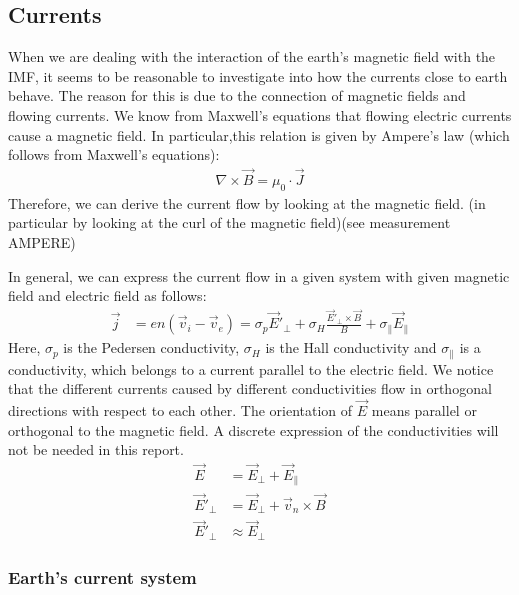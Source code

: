 \documentclass[10pt,a4paper]{article}
\begin{document}
\subsection{Currents}

When we are dealing with the interaction of the earth's magnetic field with the IMF, it seems to be reasonable to investigate into how the currents close to earth behave. 
The reason for this is due to the connection of magnetic fields and flowing currents. We know from Maxwell's equations that flowing electric currents cause a magnetic field. In particular,this relation is given by Ampere's law (which follows from Maxwell's equations):
\begin{align}
\nabla \times \vec{B}= \mu_0 \cdot \vec{J}
\end{align} 
Therefore, we can derive the current flow by looking at the magnetic field. (in particular by looking at the curl of the magnetic field)(see measurement AMPERE)

In general, we can express the current flow in a given system with given magnetic field and electric field as follows:
\begin{align}
\vec{j}&= e n ( \vec{v}_i - \vec{v}_e ) = \sigma_p \vec{E}'_{\perp} + \sigma_H \frac{\vec{E}'_{\perp} \times \vec{B}}{B} + \sigma_{\parallel} \vec{E}_{\parallel}
\end{align}
Here, $\sigma_p$ is the Pedersen conductivity, $\sigma_H$ is the Hall conductivity and $\sigma_{\parallel}$ is a conductivity, which belongs to a current parallel to the electric field. We notice that the different currents caused by different conductivities flow in orthogonal directions with respect to each other. The orientation of $\vec{E}$ means parallel or orthogonal to the magnetic field. A discrete expression of the conductivities will not be needed in this report. 
\begin{align}
\vec{E}&= \vec{E}_{\perp} +\vec{E}_{\parallel}\\
\vec{E}'_{\perp}&=\vec{E}_{\perp}+ \vec{v}_n \times \vec{B}\\
\vec{E}'_{\perp}& \approx \vec{E}_{\perp}
\end{align}

\subsubsection{Earth's current system}
\end{document}
